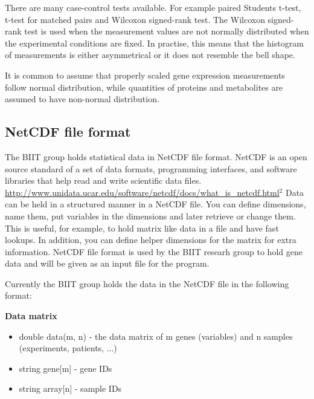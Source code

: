 \documentclass[12pt]{article}
\begin{document}
There are many case-control tests available. For example paired Students t-test, t-test for matched pairs and Wilcoxon signed-rank test. The Wilcoxon signed-rank test is used when the measurement values are not normally distributed when the experimental conditions are fixed.  In practise, this means that the histogram of measurements is either asymmetrical or it does not resemble the bell shape.

It is common to assume that properly scaled gene expression measurements follow normal distribution, while quantities of proteins and metabolites are assumed to have non-normal distribution.

\subsection{NetCDF file format}
The BIIT group holds statistical data in NetCDF file format. NetCDF is an open source standard of a set of data formats, programming interfaces, and software libraries that help read and write scientific data files. \url{http://www.unidata.ucar.edu/software/netcdf/docs/what_is_netcdf.html}$^2$
Data can be held in a structured manner in a NetCDF file. You can define dimensions, name them, put variables in the dimensions and later retrieve or change them. This is useful, for example, to hold matrix like data in a file and have fast lookups. In addition, you can define helper dimensions for the matrix for extra information.
NetCDF file format is used by the BIIT researh group to hold gene data and will be given as an input file for the program.

Currently the BIIT group holds the data in the NetCDF file in the following format:

\textbf{Data matrix}
\begin{itemize}
  \item double data(m, n) - the data matrix of m genes (variables) and n samples (experiments, patients, ...)
  \item string gene[m] - gene IDs
  \item string array[n] - sample IDs
\end{itemize}
\end{document}
